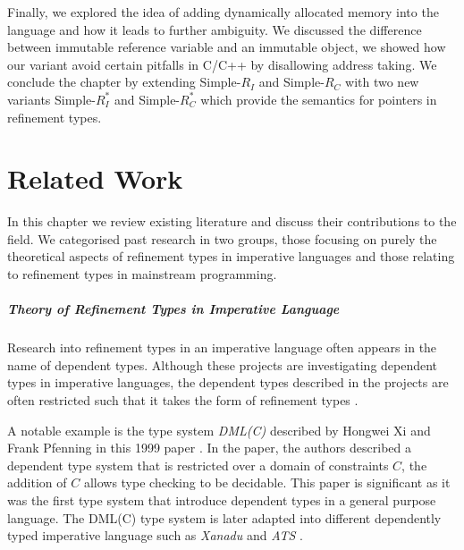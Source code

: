 \documentclass[a4paper,12pt]{report}
\begin{document}
\par
Finally, we explored the idea of adding dynamically allocated memory into the 
language and how it leads to further ambiguity. We discussed the 
difference between immutable reference variable and an immutable object, we 
showed how our variant avoid certain pitfalls in C/C++ by disallowing 
address taking. We conclude the chapter by extending Simple-$R_{I}$ 
and Simple-$R_{C}$ with two new variants Simple-$R^{*}_{I}$ and Simple-$R^{*}_{C}$ 
which provide the semantics for pointers in refinement types. 

\chapter{Related Work} \label{chapter:related_work}
In this chapter we review existing literature and discuss their  
contributions to the field. We categorised past research in two  
groups, those focusing on purely the theoretical aspects of refinement types in 
imperative languages and those relating to refinement types in mainstream 
programming. 

\paragraph{Theory of Refinement Types in Imperative Language} Research into 
refinement types in an imperative language often appears in the name of 
dependent types. Although these projects are investigating dependent types 
in imperative languages, the dependent types described in the projects are 
often restricted such that it takes the form of refinement types 
\cite{objOritentedDependentType, dynamicInDep}. 

\par
A notable example is the type system \textit{DML(C)} described by 
Hongwei Xi and Frank Pfenning in this 1999 paper \cite{dml}. In the paper, the 
authors described a dependent type system that is restricted over a 
domain of constraints $C$, the addition of $C$ allows type checking to 
be decidable. This paper is significant as it was the first type system that 
introduce dependent types in a general purpose language. The DML(C) type system 
is later adapted into different dependently typed imperative language such as 
\textit{Xanadu} \cite{xanadu} and \textit{ATS} \cite{ATS}.
\end{document}
